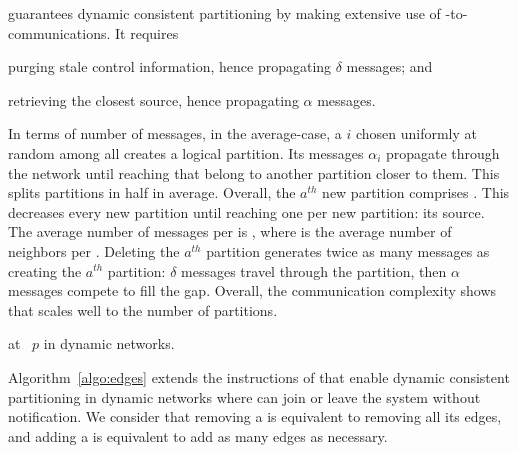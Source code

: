 \NAME guarantees dynamic consistent partitioning by making extensive
use of \process-to-\process communications. It requires
\begin{inparaenum}[(i)]
\item purging stale control information, hence propagating $\delta$
  messages; and
\item retrieving the closest source, hence propagating $\alpha$
  messages.
\end{inparaenum}
In terms of number of messages, in the average-case, a \process $i$
chosen uniformly at random among all \processes creates a logical
partition. Its messages $\alpha_i$ propagate through the network until
reaching \processes that belong to another partition closer to
them. This splits partitions in half in average. Overall, the $a^{th}$
new partition comprises  \processes. This decreases every new
partition until reaching one \process per new partition: its
source. The average number of messages per \process is
, where  is the average
number of neighbors per \process. %
Deleting the $a^{th}$ partition generates twice as many messages as
creating the $a^{th}$ partition: $\delta$ messages travel through the
partition, then $\alpha$ messages compete to fill the gap.  Overall,
the communication complexity shows that \NAME scales well to the
number of partitions.

\begin{algorithm}
  
  \caption{\label{algo:edges}\NAME at \Process~$p$ in dynamic networks.}
\end{algorithm}

Algorithm~\ref{algo:edges} extends the instructions of \NAME that
enable dynamic consistent partitioning in dynamic networks where
\processes can join or leave the system without notification. We
consider that removing a \process is equivalent to removing all its
edges, and adding a \process is equivalent to add as many edges as
necessary.

